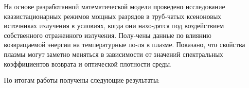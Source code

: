 


На основе разработанной математической модели проведено исследование квазистационарных режимов мощных разрядов в труб-чатых ксеноновых источниках излучения в условиях, когда они нахо-дятся под воздействием собственного отраженного излучения. Полу-чены данные по влиянию возвращаемой энергии на температурные по-ля в плазме. Показано, что свойства плазмы могут заметно меняться в зависимости от значений спектральных коэффициентов возврата и оптической плотности среды.

По итогам работы получены следующие результаты:

